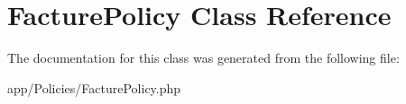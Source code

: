 \hypertarget{class_app_1_1_policies_1_1_facture_policy}{}\section{Facture\+Policy Class Reference}
\label{class_app_1_1_policies_1_1_facture_policy}


The documentation for this class was generated from the following file\+:\begin{DoxyCompactItemize}
\item 
app/\+Policies/Facture\+Policy.\+php\end{DoxyCompactItemize}
